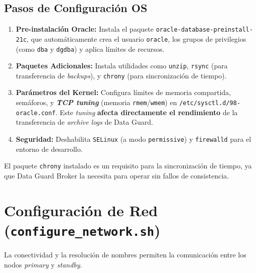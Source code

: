 \documentclass[11pt, a4paper]{report}
\begin{document}
\subsection{Pasos de Configuración OS}
\begin{enumerate}
    \item \textbf{Pre-instalación Oracle:} Instala el paquete \texttt{oracle-database-preinstall-21c}, que automáticamente crea el usuario \texttt{oracle}, los grupos de privilegios (como \texttt{dba} y \texttt{dgdba}) y aplica límites de recursos.
\item \textbf{Paquetes Adicionales:} Instala utilidades como \texttt{unzip}, \texttt{rsync} (para transferencia de \textit{backups}), y \texttt{chrony} (para sincronización de tiempo).
\item \textbf{Parámetros del Kernel:} Configura límites de memoria compartida, semáforos, y \textbf{\textit{TCP tuning}} (memoria \texttt{rmem}/\texttt{wmem}) en \texttt{/etc/sysctl.d/98-oracle.conf}.
Este \textit{tuning} \textbf{afecta directamente el rendimiento} de la transferencia de \textit{archive logs} de Data Guard.
\item \textbf{Seguridad:} Deshabilita \texttt{SELinux} (a modo \texttt{permissive}) y \texttt{firewalld} para el entorno de desarrollo.
\end{enumerate}
El paquete \texttt{chrony} instalado es un requisito para la sincronización de tiempo, ya que Data Guard Broker la necesita para operar sin fallos de consistencia.

\section{Configuración de Red (\texttt{configure\_network.sh})}

La conectividad y la resolución de nombres permiten la comunicación entre los nodos \textit{primary} y \textit{standby}.
\end{document}
